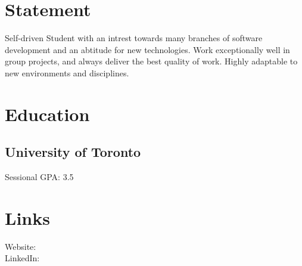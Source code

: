 \documentclass[]{dans-resume}
\begin{document}

\begin{minipage}[t]{0.30\textwidth}

\section{Statement}
Self-driven Student with an intrest towards many branches of software development and an abtitude for new technologies. Work exceptionally well in group projects, and always deliver the best quality of work. Highly adaptable to new environments and disciplines.
\sectionsep

\section{Education}
\subsection{University of Toronto}
Sessional GPA: 3.5
\sectionsep

\section{Links}
Website: \href{https://danielrazavi.github.io/}{} \\
LinkedIn: \href{https://www.linkedin.com/in/danielrazavi}{} \\

\sectionsep




\end{minipage}
\end{document}
